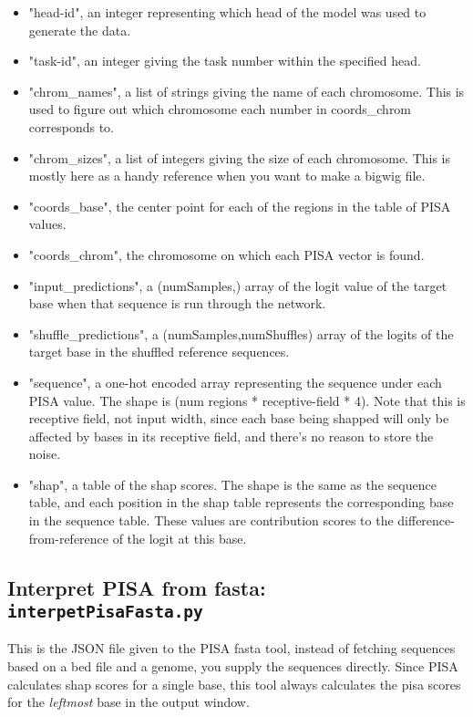 \documentclass{article}
\begin{document}
\begin{itemize}
    \item "head-id", an integer representing which head of the model was used to generate the data.
    \item "task-id", an integer giving the task number within the specified head. 
    \item "chrom\_names", a list of strings giving the name of each chromosome. This is used to figure out which chromosome each number in coords\_chrom corresponds to. 
    \item "chrom\_sizes", a list of integers giving the size of each chromosome. This is mostly here as a handy reference when you want to make a bigwig file. 
    \item "coords\_base", the center point for each of the regions in the table of PISA values. 
    \item "coords\_chrom", the chromosome on which each PISA vector is found. 
    \item "input\_predictions", a (numSamples,) array of the logit value of the target base when that sequence is run through the network.
    \item "shuffle\_predictions", a (numSamples,numShuffles) array of the logits of the target base in the shuffled reference sequences.
    \item "sequence", a one-hot encoded array representing the sequence under each PISA value. The shape is (num regions * receptive-field * 4). Note that this is receptive field, not input width, since each base being shapped will only be affected by bases in its receptive field, and there's no reason to store the noise. 
    \item "shap", a table of the shap scores. The shape is the same as the sequence table, and each position in the shap table represents the corresponding base in the sequence table. These values are contribution scores to the difference-from-reference of the logit at this base. 

\end{itemize}



\newpage

\subsection{Interpret PISA from fasta: \texttt{interpetPisaFasta.py}}

This is the JSON file given to the PISA fasta tool, instead of fetching sequences based on a bed file and a genome, you supply the sequences directly. 
Since PISA calculates shap scores for a single base, this tool always calculates the pisa scores for the \emph{leftmost} base in the output window. 
\end{document}
